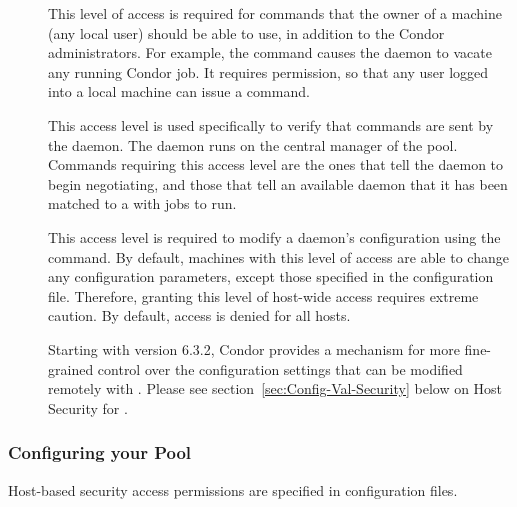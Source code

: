 \begin{description}
\item[] \label{dcperm:owner} This level of access is
   required for commands that the owner of a machine (any local user)
   should be able to use, in addition to the Condor administrators.
   For example, the  command causes the
    daemon to vacate any running Condor job.
   It requires  permission,
   so that any user logged into a local machine
   can issue a  command.

\item[] \label{dcperm:negotiator} This 
   access level is used specifically to verify that commands are
   sent by the  daemon.
   The  daemon runs on the central manager of
   the pool.
   Commands requiring this access
   level are the ones that tell the  daemon to begin
   negotiating, and those that tell an available  daemon
   that it has been matched to a  with jobs to run.

\item[] \label{dcperm:config} This access level is
   required to modify a daemon's configuration using
   the  command.
   By default, machines with this level of access are able 
   to change any configuration parameters, except those specified in
   the  configuration file.
   Therefore, granting this level of host-wide access requires
   extreme caution.
   By default,  access is denied for all hosts.

   Starting with version 6.3.2, Condor provides a mechanism for more
   fine-grained control over the configuration settings that can be
   modified remotely with .  
   Please see section~\ref{sec:Config-Val-Security} below on Host
   Security for .

\end{description}

\subsubsection{\label{sec:Config-DCPerms}Configuring your Pool}

Host-based security access
permissions are specified in configuration files.


